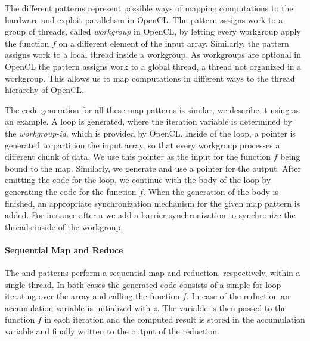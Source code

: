 The different  patterns represent possible ways of mapping computations to the hardware and exploit parallelism in OpenCL.
The  pattern assigns work to a group of threads, called \emph{workgroup} in OpenCL, by letting every workgroup apply the function $f$ on a different element of the input array.
Similarly, the  pattern assigns work to a local thread inside a workgroup.
As workgroups are optional in OpenCL the  pattern assigns work to a global thread, \ie a thread not organized in a workgroup.
This allows us to map computations in different ways to the thread hierarchy of OpenCL.%

The code generation for all these map patterns is similar, we describe it using  as an example.
A loop is generated, where the iteration variable is determined by the \emph{workgroup-id}, which is provided by OpenCL.
Inside of the loop, a pointer is generated to partition the input array, so that every workgroup processes a different chunk of data.
We use this pointer as the input for the function $f$ being bound to the map.
Similarly, we generate and use a pointer for the output.
After emitting the code for the loop, we continue with the body of the loop by generating the code for the function $f$.
When the generation of the body is finished, an appropriate synchronization mechanism for the given map pattern is added.
For instance after a  we add a barrier synchronization to synchronize the threads inside of the workgroup.




\paragraph{Sequential Map and Reduce}
The  and  patterns perform a sequential map and reduction, respectively, within a single thread.
In both cases the generated code consists of a simple for loop iterating over the array and calling the function $f$.
In case of the reduction an accumulation variable is initialized with $z$.
The variable is then passed to the function $f$ in each iteration and the computed result is stored in the accumulation variable and finally written to the output of the reduction.

